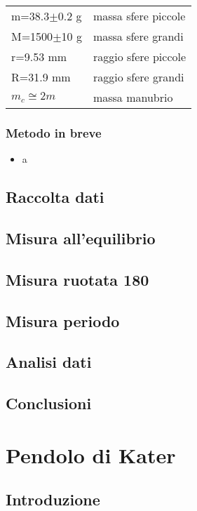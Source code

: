\documentclass[a4paper,10pt]{report}
\begin{document}
\begin{tabular}{ll}
m=38.3$\pm$0.2 g & massa sfere piccole\\
M=1500$\pm$10 g	 & massa sfere grandi\\
r=9.53 mm & raggio sfere piccole\\
R=31.9 mm	 & raggio sfere grandi\\
$m_c\cong 2m$ & massa manubrio\\
\end{tabular}

\subsection{Metodo in breve}
\begin{itemize}
\item a
\end{itemize}
\section{Raccolta dati}
\section{Misura all'equilibrio}
\section{Misura ruotata 180}
\section{Misura periodo}
\section{Analisi dati}
\section{Conclusioni}

\chapter{Pendolo di Kater}
\section{Introduzione}
\section{}
\end{document}
